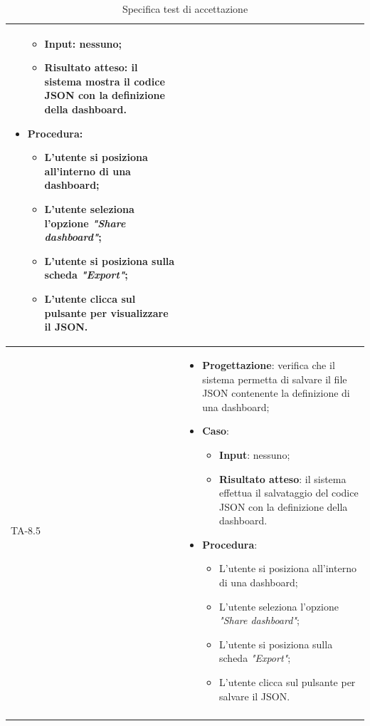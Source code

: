 \begin{longtable}{|C{2.5cm}|C{13cm}|}
\begin{itemize}
\begin{itemize}
		\item \textbf{Input}: nessuno;
		\item \textbf{Risultato atteso}: il sistema mostra il codice JSON con la definizione della dashboard.
	\end{itemize}
	\item \textbf{Procedura}:
	\begin{itemize}
		\item L'utente si posiziona all'interno di una dashboard;
		\item L'utente seleziona l'opzione \emph{"Share dashboard"};
		\item L'utente si posiziona sulla scheda \emph{"Export"};
		\item L'utente clicca sul pulsante per visualizzare il JSON.
	\end{itemize} 
\end{itemize}\\
\hline
{TA-8.5} &
\begin{itemize}
	\item \textbf{Progettazione}: verifica che il sistema permetta di salvare il file JSON contenente la definizione di una
	dashboard;
	\item \textbf{Caso}: 
	\begin{itemize}
		\item \textbf{Input}: nessuno;
		\item \textbf{Risultato atteso}: il sistema effettua il salvataggio del codice JSON con la definizione della dashboard.
	\end{itemize}
	\item \textbf{Procedura}:
	\begin{itemize}
		\item L'utente si posiziona all'interno di una dashboard;
		\item L'utente seleziona l'opzione \emph{"Share dashboard"};
		\item L'utente si posiziona sulla scheda \emph{"Export"};
		\item L'utente clicca sul pulsante per salvare il JSON.
	\end{itemize} 
\end{itemize}\\
\hline
\caption{Specifica test di accettazione}
\end{longtable}
\renewcommand{\arraystretch}{1}
\newpage

